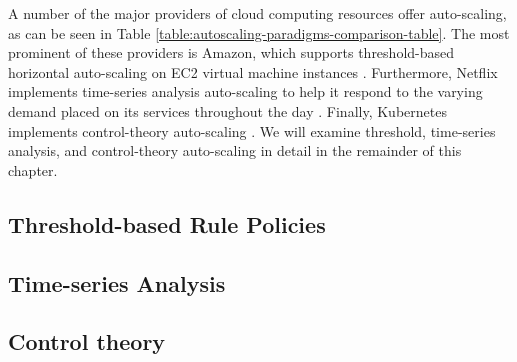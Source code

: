 A number of the major providers of cloud computing resources offer auto-scaling,
as can be seen in Table \ref{table:autoscaling-paradigms-comparison-table}.
The most prominent of these providers is Amazon, which supports threshold-based
horizontal auto-scaling on EC2 virtual machine
instances \cite{amazon-auto-scaling-developer-guide}. Furthermore, Netflix
implements time-series analysis auto-scaling to help it respond to the
varying demand placed on its services throughout the
day \cite{netflix-scryer-part-i}. Finally, Kubernetes
implements control-theory auto-scaling
\cite{k8s-horizontal-pod-autoscaler-proposal}.
We will examine threshold, time-series analysis, and control-theory
auto-scaling in detail in the remainder of this chapter.



\subsection{Threshold-based Rule Policies}



\subsection{Time-series Analysis}



\subsection{Control theory}



